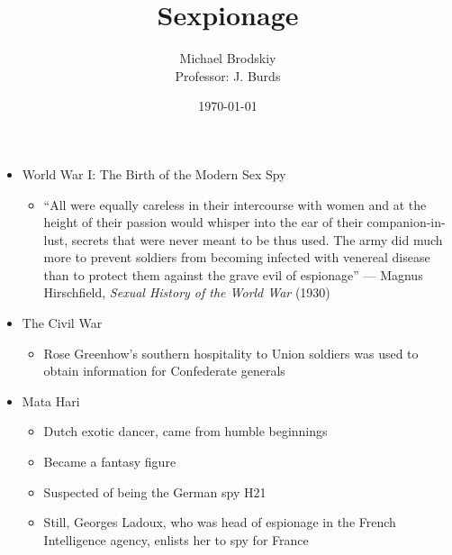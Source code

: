 

\title{Sexpionage}
\date{\today}
\author{Michael Brodskiy\\ \small Professor: J. Burds}



\maketitle

\begin{itemize}

  \item World War I: The Birth of the Modern Sex Spy

    \begin{itemize}

      \item ``All were equally careless in their intercourse with women and at the height of their passion would whisper into the ear of their companion-in-lust, secrets that were never meant to be thus used. The army did much more to prevent soldiers from becoming infected with venereal disease than to protect them against the grave evil of espionage'' — Magnus Hirschfield, \textit{Sexual History of the World War} (1930)

    \end{itemize}

  \item The Civil War

    \begin{itemize}

      \item Rose Greenhow's southern hospitality to Union soldiers was used to obtain information for Confederate generals

    \end{itemize}

  \item Mata Hari

    \begin{itemize}

      \item Dutch exotic dancer, came from humble beginnings

      \item Became a fantasy figure

      \item Suspected of being the German spy H21

      \item Still, Georges Ladoux, who was head of espionage in the French Intelligence agency, enlists her to spy for France


\end{itemize}
\end{itemize}
